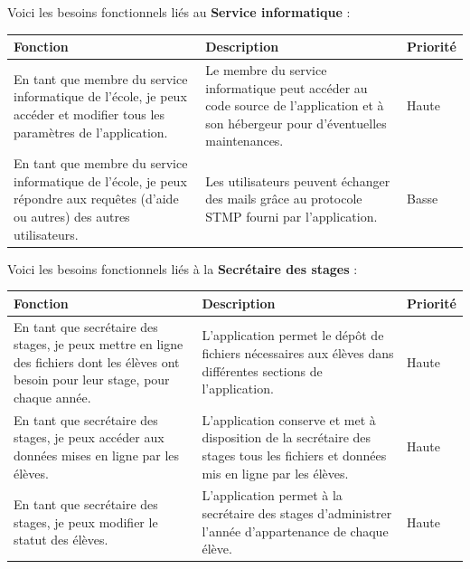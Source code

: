 \documentclass{scrreprt}
\begin{document}
\vspace{1cm}
Voici les besoins fonctionnels liés au \textbf{Service informatique} :
\begin{center}
\begin{tabular}{|p{5cm}|p{7cm}|p{2cm}|}
  \hline
  \textbf {Fonction} & \textbf {Description} & \textbf {Priorité} \\
  \hline
  En tant que membre du service informatique de l'école, je peux accéder et modifier tous les paramètres de l'application. & Le membre du service informatique peut accéder au code source de l'application et à son hébergeur pour d'éventuelles maintenances.  & Haute\\
  \hline
  En tant que membre du service informatique de l'école, je peux répondre aux requêtes (d'aide ou autres) des autres utilisateurs. & Les utilisateurs peuvent échanger des mails grâce au protocole STMP fourni par l'application. & Basse\\ 
  \hline
\end{tabular}
\end{center}

\vspace{1cm}
Voici les besoins fonctionnels liés à la \textbf{Secrétaire des stages} :
\begin{center}
\begin{tabular}{|p{5cm}|p{7cm}|p{2cm}|}
  \hline
  \textbf {Fonction} & \textbf {Description} & \textbf {Priorité} \\
  \hline
  En tant que secrétaire des stages, je peux mettre en ligne des fichiers dont les élèves ont besoin pour leur stage, pour chaque année. & L'application permet le dépôt de fichiers nécessaires aux élèves dans différentes sections de l'application. & Haute\\
  \hline
  En tant que secrétaire des stages, je peux accéder aux données mises en ligne par les élèves. & L'application conserve et met à disposition de la secrétaire des stages tous les fichiers et données mis en ligne par les élèves. & Haute\\ 
  \hline
  En tant que secrétaire des stages, je peux modifier le statut des élèves. & L'application permet à la secrétaire des stages d'administrer l'année d'appartenance de chaque élève. & Haute\\ 
  \hline
\end{tabular}
\end{center}
\end{document}
